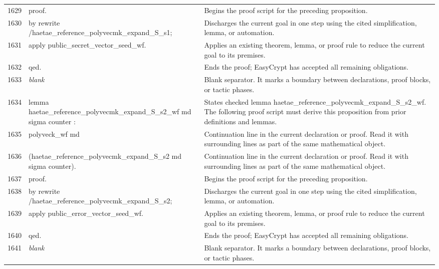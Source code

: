 \documentclass[10pt]{article}
\begin{document}
\begin{longtable}{r L{0.53\textwidth} L{0.37\textwidth}}
1629 & {\ttfamily\scriptsize proof.} & Begins the proof script for the preceding proposition. \\
1630 & {\ttfamily\scriptsize by rewrite /haetae\_reference\_polyvecmk\_expand\_S\_s1;} & Discharges the current goal in one step using the cited simplification, lemma, or automation. \\
1631 & {\ttfamily\scriptsize    apply public\_secret\_vector\_seed\_wf.} & Applies an existing theorem, lemma, or proof rule to reduce the current goal to its premises. \\
1632 & {\ttfamily\scriptsize qed.} & Ends the proof; EasyCrypt has accepted all remaining obligations. \\
1633 & {\ttfamily\scriptsize \emph{blank}} & Blank separator.  It marks a boundary between declarations, proof blocks, or tactic phases. \\
1634 & {\ttfamily\scriptsize lemma haetae\_reference\_polyvecmk\_expand\_S\_s2\_wf md sigma counter :} & States checked lemma haetae\_reference\_polyvecmk\_expand\_S\_s2\_wf.  The following proof script must derive this proposition from prior definitions and lemmas. \\
1635 & {\ttfamily\scriptsize   polyveck\_wf md} & Continuation line in the current declaration or proof.  Read it with surrounding lines as part of the same mathematical object. \\
1636 & {\ttfamily\scriptsize     (haetae\_reference\_polyvecmk\_expand\_S\_s2 md sigma counter).} & Continuation line in the current declaration or proof.  Read it with surrounding lines as part of the same mathematical object. \\
1637 & {\ttfamily\scriptsize proof.} & Begins the proof script for the preceding proposition. \\
1638 & {\ttfamily\scriptsize by rewrite /haetae\_reference\_polyvecmk\_expand\_S\_s2;} & Discharges the current goal in one step using the cited simplification, lemma, or automation. \\
1639 & {\ttfamily\scriptsize    apply public\_error\_vector\_seed\_wf.} & Applies an existing theorem, lemma, or proof rule to reduce the current goal to its premises. \\
1640 & {\ttfamily\scriptsize qed.} & Ends the proof; EasyCrypt has accepted all remaining obligations. \\
1641 & {\ttfamily\scriptsize \emph{blank}} & Blank separator.  It marks a boundary between declarations, proof blocks, or tactic phases. \\

\end{longtable}
\end{document}
